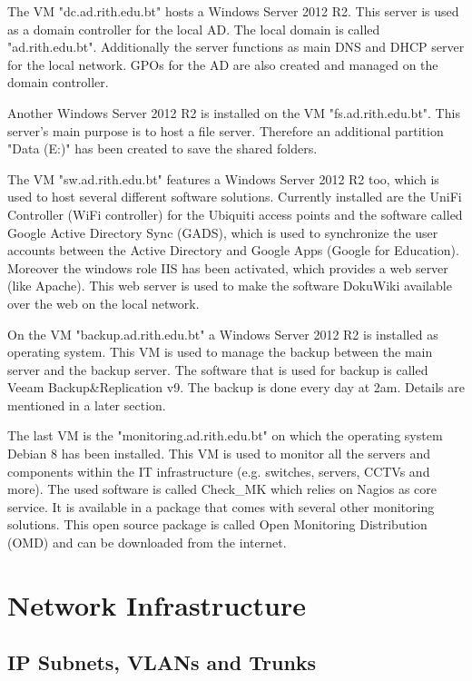The VM "dc.ad.rith.edu.bt" hosts a Windows Server 2012 R2. This server is used as a domain controller for the local \ac{AD}. The local domain is called "ad.rith.edu.bt". Additionally the server functions as main \ac{DNS} and \ac{DHCP} server for the local network. \acp{GPO} for the \ac{AD} are also created and managed on the domain controller.

Another Windows Server 2012 R2 is installed on the VM "fs.ad.rith.edu.bt". This server's main purpose is to host a file server. Therefore an additional partition "Data (E:)" has been created to save the shared folders. 

The VM "sw.ad.rith.edu.bt" features a Windows Server 2012 R2 too, which is used to host several different software solutions. Currently installed are the UniFi Controller (WiFi controller) for the Ubiquiti access points and the software called Google Active Directory Sync (GADS), which is used to synchronize the user accounts between the Active Directory and Google Apps (Google for Education). \\
Moreover the windows role IIS has been activated, which provides a web server (like Apache). This web server is used to make the software DokuWiki available over the web on the local network.

On the VM "backup.ad.rith.edu.bt" a Windows Server 2012 R2 is installed as operating system. This VM is used to manage the backup between the main server and the backup server. The software that is used for backup is called Veeam Backup\&Replication v9. The backup is done every day at 2am. Details are mentioned in a later section.

The last VM is the "monitoring.ad.rith.edu.bt" on which the operating system Debian 8 has been installed. This VM is used to monitor all the servers and components within the IT infrastructure (e.g. switches, servers, CCTVs and more). The used software is called Check\_MK which relies on Nagios as core service. It is available in a package that comes with several other monitoring solutions. This open source package is called Open Monitoring Distribution (OMD) and can be downloaded from the internet. 

\section{Network Infrastructure}

\subsection{IP Subnets, VLANs and Trunks}

